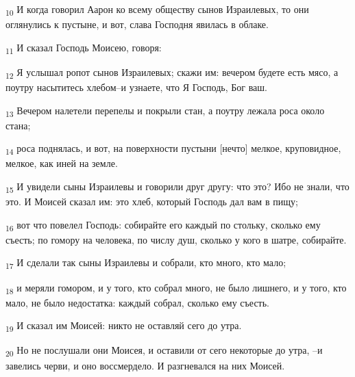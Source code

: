 \begin{tcolorbox}
\textsubscript{10} И когда говорил Аарон ко всему обществу сынов Израилевых, то они оглянулись к пустыне, и вот, слава Господня явилась в облаке.
\end{tcolorbox}
\begin{tcolorbox}
\textsubscript{11} И сказал Господь Моисею, говоря:
\end{tcolorbox}
\begin{tcolorbox}
\textsubscript{12} Я услышал ропот сынов Израилевых; скажи им: вечером будете есть мясо, а поутру насытитесь хлебом--и узнаете, что Я Господь, Бог ваш.
\end{tcolorbox}
\begin{tcolorbox}
\textsubscript{13} Вечером налетели перепелы и покрыли стан, а поутру лежала роса около стана;
\end{tcolorbox}
\begin{tcolorbox}
\textsubscript{14} роса поднялась, и вот, на поверхности пустыни [нечто] мелкое, круповидное, мелкое, как иней на земле.
\end{tcolorbox}
\begin{tcolorbox}
\textsubscript{15} И увидели сыны Израилевы и говорили друг другу: что это? Ибо не знали, что это. И Моисей сказал им: это хлеб, который Господь дал вам в пищу;
\end{tcolorbox}
\begin{tcolorbox}
\textsubscript{16} вот что повелел Господь: собирайте его каждый по стольку, сколько ему съесть; по гомору на человека, по числу душ, сколько у кого в шатре, собирайте.
\end{tcolorbox}
\begin{tcolorbox}
\textsubscript{17} И сделали так сыны Израилевы и собрали, кто много, кто мало;
\end{tcolorbox}
\begin{tcolorbox}
\textsubscript{18} и меряли гомором, и у того, кто собрал много, не было лишнего, и у того, кто мало, не было недостатка: каждый собрал, сколько ему съесть.
\end{tcolorbox}
\begin{tcolorbox}
\textsubscript{19} И сказал им Моисей: никто не оставляй сего до утра.
\end{tcolorbox}
\begin{tcolorbox}
\textsubscript{20} Но не послушали они Моисея, и оставили от сего некоторые до утра, --и завелись черви, и оно воссмердело. И разгневался на них Моисей.
\end{tcolorbox}
